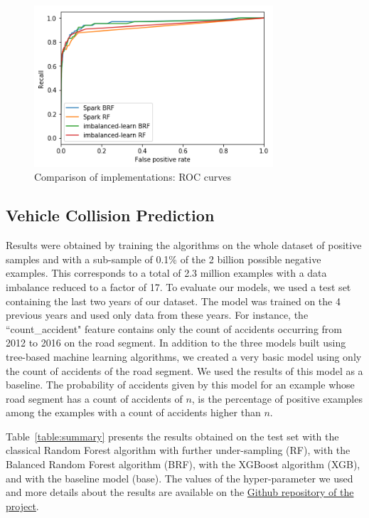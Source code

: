 \documentclass[conference]{IEEEtran}
\begin{document}
\begin{figure}[htbp]
\centerline{\includegraphics[height=6cm, keepaspectratio]{Figures/test_brf_roc.png}}
\caption{Comparison of implementations: ROC curves}
\label{fig:test-brf-roc}
\end{figure}

\subsection{Vehicle Collision Prediction}

Results were obtained by training the algorithms on the whole
dataset of positive samples and with a sub-sample of 0.1\% of the 2
billion possible negative examples. This corresponds to a total of 2.3
million examples with a data imbalance reduced to a factor of 17. To
evaluate our models, we used a test set containing the last two years of our
dataset. The model was trained on the 4 previous years and used only data
from these years. For instance, the ``count\_accident" feature contains only
the count of accidents occurring from 2012 to 2016 on the road segment.
In addition to the three models built using tree-based machine learning algorithms,
we created a very basic model using only the count of accidents of the road segment.
We used the results of this model as a baseline. 
The probability of accidents given 
by this model for an example whose road segment has a count of accidents of $n$, is the percentage
of positive examples among the examples with a count of accidents higher than $n$.

Table~\ref{table:summary} presents the results obtained on the test set with the classical
Random Forest algorithm with further under-sampling (RF), with the Balanced Random Forest algorithm (BRF), with the XGBoost algorithm (XGB), and with the baseline model (base). The values of the hyper-parameter we used and more details about the results are available on the \href{https://github.com/big-data-lab-team/accident-prediction-montreal/tree/master/results}{Github repository of the project}.
\end{document}
